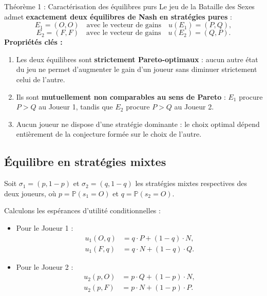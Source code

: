 \documentclass[11pt,a4paper]{article}
\begin{document}
\begin{propbox}{Théorème 1 : Caractérisation des équilibres purs}
Le jeu de la Bataille des Sexes admet \textbf{exactement deux équilibres de Nash en stratégies pures} :
\begin{equation}
E_1 = (O, O) \quad \text{avec le vecteur de gains} \quad u(E_1) = (P, Q),
\end{equation}
\begin{equation}
E_2 = (F, F) \quad \text{avec le vecteur de gains} \quad u(E_2) = (Q, P).
\end{equation}
\textbf{Propriétés clés :}
\begin{enumerate}[label=(\roman*)]
    \item Les deux équilibres sont \textbf{strictement Pareto-optimaux} : aucun autre état du jeu ne permet d'augmenter le gain d'un joueur sans diminuer strictement celui de l'autre.
    \item Ils sont \textbf{mutuellement non comparables au sens de Pareto} : $E_1$ procure $P > Q$ au Joueur 1, tandis que $E_2$ procure $P > Q$ au Joueur 2.
    \item Aucun joueur ne dispose d'une stratégie dominante : le choix optimal dépend entièrement de la conjecture formée sur le choix de l'autre.
\end{enumerate}
\end{propbox}

\subsection{Équilibre en stratégies mixtes}
Soit $\sigma_1 = (p, 1-p)$ et $\sigma_2 = (q, 1-q)$ les stratégies mixtes respectives des deux joueurs, où $p = \mathbb{P}(s_1 = O)$ et $q = \mathbb{P}(s_2 = O)$.

Calculons les espérances d'utilité conditionnelles :
\begin{itemize}[leftmargin=1.5em]
    \item Pour le Joueur 1 :
    \begin{align}
    u_1(O, q) &= q \cdot P + (1-q) \cdot N, \\
    u_1(F, q) &= q \cdot N + (1-q) \cdot Q.
    \end{align}
    \item Pour le Joueur 2 :
    \begin{align}
    u_2(p, O) &= p \cdot Q + (1-p) \cdot N, \\
    u_2(p, F) &= p \cdot N + (1-p) \cdot P.
    \end{align}
\end{itemize}
\end{document}
